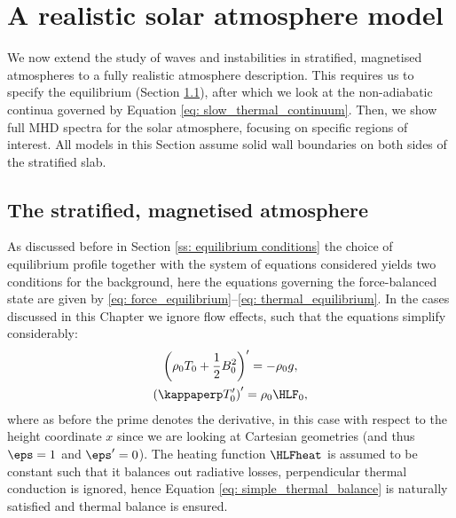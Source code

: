 \section{A realistic solar atmosphere model} \label{sec: solar_atmosphere}
We now extend the study of waves and instabilities in stratified, magnetised atmospheres to a fully realistic atmosphere description. This requires us to specify the equilibrium (Section \ref{ss: atmosphere_model}), after which we look at the non-adiabatic continua governed by Equation \eqref{eq: slow_thermal_continuum}. Then, we show full MHD spectra for the solar atmosphere, focusing on specific regions of interest. All models in this Section assume solid wall boundaries on both sides of the stratified slab.

\subsection{The stratified, magnetised atmosphere} \label{ss: atmosphere_model}
As discussed before in Section \ref{ss: equilibrium conditions} the choice of equilibrium profile together with the system of equations considered yields two conditions for the background, here the equations governing the force-balanced state are given by \eqref{eq: force_equilibrium}--\eqref{eq: thermal_equilibrium}. In the cases discussed in this Chapter we ignore flow effects, such that the equations simplify considerably:
\begin{gather}
  \left(\rho_0 T_0 + \frac{1}{2}B_0^2\right)' = -\rho_0 g, \label{eq: simple_force_balance} \\
  \left(\kappaperp T_0'\right)' = \rho_0 \HLF_0, \label{eq: simple_thermal_balance}
\end{gather}
where as before the prime denotes the derivative, in this case with respect to the height coordinate $x$ since we are looking at Cartesian geometries (and thus $\eps = 1$ and $\eps' = 0$). The heating function $\HLFheat$ is assumed to be constant such that it balances out radiative losses, perpendicular thermal conduction is ignored, hence Equation \eqref{eq: simple_thermal_balance} is naturally satisfied and thermal balance is ensured.

